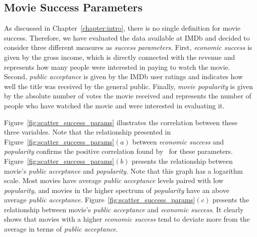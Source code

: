 \subsection{Movie Success Parameters}
\label{sec:success}
As discussed in Chapter~\ref{chapter:intro}, there is no single definition for
movie success. Therefore, we have evaluated the data available at IMDb and
decided to consider three different measures as \textit{success parameters}.
First, \textit{economic success} is given by the gross income, which is
directly connected with the revenue and represents how many people were
interested in paying to watch the movie. Second, \textit{public acceptance} is
given by the IMDb user ratings and indicates how well the title was received by
the general public.  Finally, \textit{movie popularity} is given by the
absolute number of votes the movie received and represents the number of people
who have watched the movie and were interested in evaluating it.

Figure~\ref{fig:scatter_success_params} illustrates the correlation between
these three variables. Note that the relationship presented in
Figure~\ref{fig:scatter_success_params}$(a)$ between \textit{economic success}
and \textit{popularity} confirms the positive correlation found
by~\cite{wasserman2015cross} for these parameters.
Figure~\ref{fig:scatter_success_params}$(b)$ presents the relationship between
movie's \textit{public acceptance} and \textit{popularity}. Note that this
graph has a logarithm scale. Most movies have average
\textit{public acceptance} levels paired with low \textit{popularity}, and
movies in the higher spectrum of \textit{popularity} have an above average
\textit{public acceptance}.  Figure~\ref{fig:scatter_success_params}$(c)$
presents the relationship between movie's \textit{public acceptance} and
\textit{economic success}. It clearly shows that movies with a higher
\textit{economic success} tend to deviate more from the average in terms of
\textit{public acceptance}.

